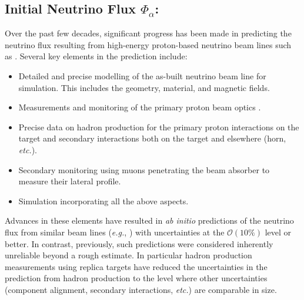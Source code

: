\subsection{Initial Neutrino Flux $\Phi_\alpha$:}
Over the past few decades, significant progress has been made in predicting the neutrino flux resulting from high-energy proton-based neutrino beam lines such as . Several key elements in the prediction include:
\begin{itemize}
\item Detailed and precise modelling of the as-built neutrino beam line for simulation. This includes the geometry, material, and magnetic fields.
\item Measurements and monitoring of the primary proton beam optics .
\item Precise data on hadron production for the primary proton interactions on the target and secondary interactions both on the target and elsewhere (horn, {\em etc.}).
\item Secondary monitoring using muons penetrating the beam absorber to measure their lateral profile. 
\item Simulation incorporating all the above aspects.
\end{itemize}
Advances in these elements have resulted in  {\em ab initio} predictions of the neutrino flux from similar beam lines ({\em e.g.}, ) with uncertainties at the $\mathcal{O}(10\%)$ level or better. In contrast, previously, such predictions were considered inherently unreliable beyond a rough estimate. In particular hadron production measurements using replica targets have reduced the uncertainties in the prediction from hadron production to the level where other uncertainties (component alignment, secondary interactions, {\em etc.}) are comparable in size. 

